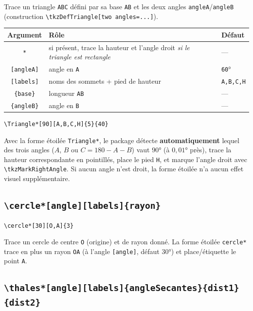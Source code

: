 \documentclass[11pt,a4paper]{article}
\newcommand{\cmdname}[1]{\texttt{\textbackslash#1}}
\begin{document}
Trace un triangle \texttt{ABC} défini par sa base \texttt{AB} et les deux angles \texttt{angleA}/\texttt{angleB} (construction \texttt{\textbackslash tkzDefTriangle[two angles=...]}).

\begin{center}
\begin{tabular}{@{}cll@{}}
\toprule
\textbf{Argument} & \textbf{Rôle} & \textbf{Défaut} \\
\midrule
\texttt{*} & si présent, trace la hauteur et l'angle droit \emph{si le triangle est rectangle} & --- \\
\texttt{[angleA]} & angle en \texttt{A} & \texttt{60}° \\
\texttt{[labels]} & noms des sommets + pied de hauteur & \texttt{A,B,C,H} \\
\texttt{\{base\}} & longueur \texttt{AB} & --- \\
\texttt{\{angleB\}} & angle en \texttt{B} & --- \\
\bottomrule
\end{tabular}
\end{center}

\begin{lstlisting}
\Triangle*[90][A,B,C,H]{5}{40}
\end{lstlisting}

\begin{noteFig}
Avec la forme étoilée \texttt{Triangle*}, le package détecte \textbf{automatiquement} lequel des trois angles ($A$, $B$ ou $C=180-A-B$) vaut $90°$ (à $0{,}01°$ près), trace la hauteur correspondante en pointillés, place le pied \texttt{H}, et marque l'angle droit avec \texttt{\textbackslash tkzMarkRightAngle}. Si aucun angle n'est droit, la forme étoilée n'a aucun effet visuel supplémentaire.
\end{noteFig}

\subsection{\cmdname{cercle*[angle][labels]\{rayon\}}}

\begin{lstlisting}
\cercle*[30][O,A]{3}
\end{lstlisting}

Trace un cercle de centre \texttt{O} (origine) et de rayon donné. La forme étoilée \texttt{cercle*} trace en plus un rayon \texttt{OA} (à l'angle \texttt{[angle]}, défaut $30°$) et place/étiquette le point \texttt{A}.

\subsection{\cmdname{thales*[angle][labels]\{angleSecantes\}\{dist1\}\{dist2\}}}
\end{document}
